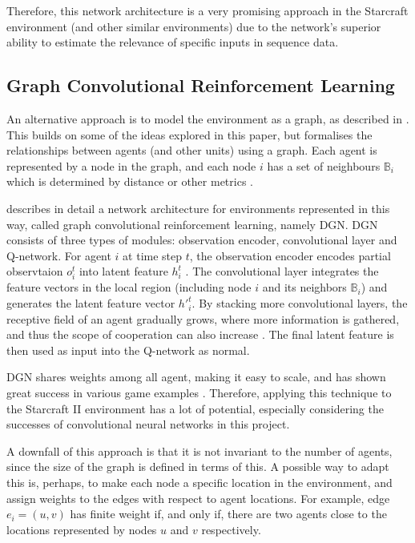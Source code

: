 Therefore, this network architecture is a very promising approach in the Starcraft environment (and other similar environments) due to the network's superior ability to estimate the relevance of specific inputs in sequence data.


\subsection{Graph Convolutional Reinforcement Learning}

An alternative approach is to model the environment as a graph, as described in \cite{graph}. This builds on some of the ideas explored in this paper, but formalises the relationships between agents (and other units) using a graph. Each agent is represented by a node in the graph, and each node $i$ has a set of neighbours $\mathbb{B}_i$ which is determined by distance or other metrics \cite{graph}.

\cite{graph} describes in detail a network architecture for environments represented in this way, called graph  convolutional reinforcement learning, namely DGN. DGN consists of three types of modules:  observation encoder, convolutional layer and Q-network. For agent $i$ at time step $t$, the observation encoder encodes partial observtaion $o_i^t$ into latent feature $h_i^t$ \cite{graph}. The convolutional layer integrates the feature vectors in the local region (including node $i$ and its neighbors $\mathbb{B}_i$) and generates the latent feature vector $h′^t_i$. By stacking more convolutional layers, the receptive field of an agent gradually grows, where more information is gathered, and thus the scope of cooperation can also increase \cite{graph}. The final latent feature is then used as input into the Q-network as normal.

DGN shares weights among all agent, making it easy to scale, and has shown great success in various game examples \cite{graph}. Therefore, applying this technique to the Starcraft II environment has a lot of potential, especially considering the successes of convolutional neural networks in this project. 

A downfall of this approach is that it is not invariant to the number of agents, since the size of the graph is defined in terms of this. A possible way to adapt this is, perhaps, to make each node a specific location in the environment, and assign weights to the edges with respect to agent locations. For example, edge $e_i = (u,v)$ has finite weight if, and only if, there are two agents close to the locations represented by nodes $u$ and $v$ respectively.


